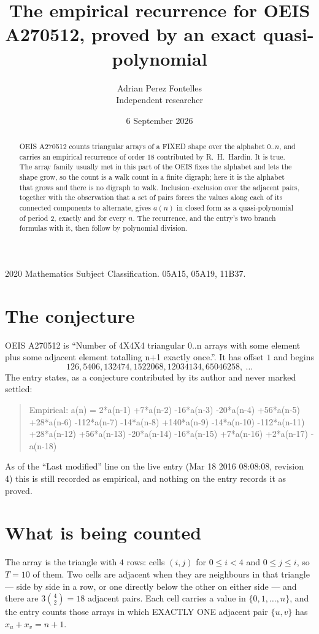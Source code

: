 \documentclass[11pt,a4paper]{article}
\title{The empirical recurrence for OEIS A270512, proved by an exact quasi-polynomial}
\author{Adrian Perez Fontelles\\ \small Independent researcher}
\date{6 September 2026}
\theoremstyle{plain}
\theoremstyle{definition}
\begin{document}
\maketitle

\begin{abstract}
OEIS A270512 counts triangular arrays of a FIXED shape over the alphabet $0..n$, and carries an
empirical recurrence of order $18$ contributed by R.~H.~Hardin. It is true. The array
family usually met in this part of the OEIS fixes the alphabet and lets the shape grow, so the
count is a walk count in a finite digraph; here it is the alphabet that grows and there is no
digraph to walk. Inclusion--exclusion over the adjacent pairs, together with the observation
that a set of pairs forces the values along each of its connected components to alternate,
gives $a(n)$ in closed form as a quasi-polynomial of period $2$, exactly and for every $n$.
The recurrence, and the entry's two branch formulas with it, then follow by polynomial
division.
\end{abstract}

\noindent\small 2020 Mathematics Subject Classification. 05A15, 05A19, 11B37.\normalsize

\section{The conjecture}

OEIS A270512 is ``Number of 4X4X4 triangular 0..n arrays with some element plus some adjacent element totalling n+1 exactly once.''. It has offset $1$ and begins
\[
126, 5406, 132474, 1522068, 12034134, 65046258,\ \dots
\]
The entry states, as a conjecture contributed by its author and never marked settled:
\begin{quote}
Empirical: a(n) = 2*a(n-1) +7*a(n-2) -16*a(n-3) -20*a(n-4) +56*a(n-5) +28*a(n-6) -112*a(n-7) -14*a(n-8) +140*a(n-9) -14*a(n-10) -112*a(n-11) +28*a(n-12) +56*a(n-13) -20*a(n-14) -16*a(n-15) +7*a(n-16) +2*a(n-17) -a(n-18)
\end{quote}
As of the ``Last modified'' line on the live entry (Mar 18 2016 08:08:08, revision 4) this is still
recorded as empirical, and nothing on the entry records it as proved.

\section{What is being counted}

The array is the triangle with $4$ rows: cells $(i,j)$ for $0\le i<4$ and $0\le j\le i$,
so $T=10$ of them. Two cells are adjacent when they are neighbours in that triangle --- side
by side in a row, or one directly below the other on either side --- and there are
$3\binom{4}{2}=18$ adjacent pairs. Each cell carries a value in
$\{0,1,\dots,n\}$, and the entry counts those arrays in which EXACTLY ONE adjacent pair
$\{u,v\}$ has $x_u+x_v=n+1$.
\end{document}

